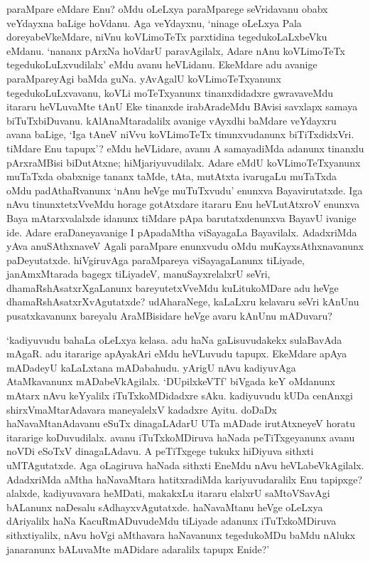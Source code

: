 paraMpare eMdare Enu? oMdu oLeLxya paraMparege seVridavanu obabx veYdayxna baLige hoVdanu. Aga veYdayxnu, `ninage oLeLxya Pala doreyabeVkeMdare, niVnu koVLimoTeTx parxtidina tegedukoLaLxbeVku eMdanu. `nananx pArxNa hoVdarU paravAgilalx, Adare nAnu koVLimoTeTx tegedukoLuLxvudilalx' eMdu avanu heVLidanu. EkeMdare adu avanige paraMpareyAgi baMda guNa. yAvAgalU koVLimoTeTxyanunx tegedukoLuLxvavanu, koVLi moTeTxyanunx tinanxdidadxre gwravaveMdu itararu heVLuvaMte tAnU Eke tinanxde irabAradeMdu BAvisi savxlapx samaya biTuTxbiDuvanu. kAlAnaMtaradalilx avanige vAyxdhi baMdare veYdayxru avana baLige, `Iga tAneV niVvu koVLimoTeTx tinunxvudanunx biTiTxdidxVri. tiMdare Enu tapupx'? eMdu heVLidare, avanu A samayadiMda adanunx tinanxlu pArxraMBisi biDutAtxne; hiMjariyuvudilalx. Adare eMdU koVLimoTeTxyanunx muTaTxda obabxnige tananx taMde, tAta, mutAtxta ivarugaLu muTaTxda oMdu padAthaRvanunx `nAnu heVge muTuTxvudu' enunxva Bayavirutatxde. Iga nAvu tinunxtetxVveMdu horage gotAtxdare itararu Enu heVLutAtxroV enunxva Baya mAtarxvalalxde idanunx tiMdare pApa barutatxdenunxva BayavU ivanige ide. Adare eraDaneyavanige I pApadaMtha viSayagaLa Bayavilalx. AdadxriMda yAva anuSAthxnaveV Agali paraMpare enunxvudu oMdu muKayxsAthxnavanunx paDeyutatxde. hiVgiruvAga paraMpareya viSayagaLanunx tiLiyade, janAmxMtarada bagegx tiLiyadeV, manuSayxrelalxrU seVri, dhamaRshAsatxrXgaLanunx bareyutetxVveMdu kuLitukoMDare adu heVge dhamaRshAsatxrXvAgutatxde? udAharaNege, kaLaLxru kelavaru seVri kAnUnu pusatxkavanunx bareyalu AraMBisidare heVge avaru kAnUnu mADuvaru?

`kadiyuvudu bahaLa oLeLxya kelasa. adu haNa gaLisuvudakekx sulaBavAda mAgaR. adu itararige apAyakAri eMdu heVLuvudu tapupx. EkeMdare apAya mADadeyU kaLaLxtana mADabahudu. yArigU nAvu kadiyuvAga AtaMkavanunx mADabeVkAgilalx. `DUpilxkeVTf' biVgada keY oMdanunx mAtarx nAvu keYyalilx iTuTxkoMDidadxre sAku. kadiyuvudu kUDa cenAnxgi shirxVmaMtarAdavara maneyalelxV kadadxre Ayitu. doDaDx haNavaMtanAdavanu eSuTx dinagaLAdarU UTa mADade irutAtxneyeV horatu itararige koDuvudilalx. avanu iTuTxkoMDiruva haNada peTiTxgeyanunx avanu noVDi eSoTxV dinagaLAdavu. A peTiTxgege tukukx hiDiyuva sithxti uMTAgutatxde. Aga oLagiruva haNada sithxti EneMdu nAvu heVLabeVkAgilalx. AdadxriMda aMtha haNavaMtara hatitxradiMda kariyuvudaralilx Enu tapipxge? alalxde, kadiyuvavara heMDati, makakxLu itararu elalxrU saMtoVSavAgi bALanunx naDesalu sAdhayxvAgutatxde. haNavaMtanu heVge oLeLxya dAriyalilx haNa KacuRmADuvudeMdu tiLiyade adanunx iTuTxkoMDiruva sithxtiyalilx, nAvu hoVgi aMthavara haNavanunx tegedukoMDu baMdu nAlukx janaranunx bALuvaMte mADidare adaralilx tapupx Enide?'

